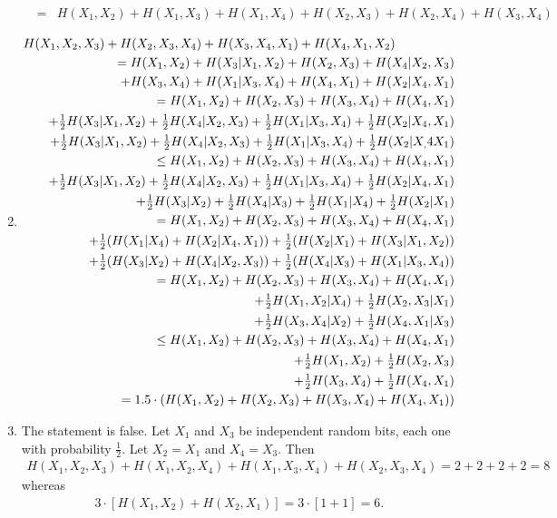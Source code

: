 \documentclass[11pt]{article} \usepackage{amssymb}
\newcommand{\half}{{\textstyle \frac12}}
\begin{document}
\begin{enumerate}
\begin{eqnarray*}
&=&H(X_1,X_2)+H(X_1,X_3)+H(X_1,X_4)+H(X_2,X_3)+H(X_2,X_4)+H(X_3,X_4) 
  \end{eqnarray*}
\item
  \begin{eqnarray*}
    \lefteqn{H(X_1,X_2,X_3)+H(X_2,X_3,X_4)+H(X_3,X_4,X_1)+H(X_4,X_1,X_2)}\\
&&= H(X_1,X_2)+H(X_3|X_1,X_2)+H(X_2,X_3)+H(X_4|X_2,X_3)\\
&&\quad+H(X_3,X_4)+H(X_1|X_3,X_4)+H(X_4,X_1)+H(X_2|X_4,X_1)\\
&&= H(X_1,X_2)+H(X_2,X_3)+H(X_3,X_4)+H(X_4,X_1)\\
&&\quad+\half H(X_3|X_1,X_2)+\half H(X_4|X_2,X_3)+\half H(X_1|X_3,X_4)+\half H(X_2|X_4,X_1)\\
&&\quad+\half H(X_3|X_1,X_2)+\half H(X_4|X_2,X_3)+\half H(X_1|X_3,X_4)+\half H(X_2|X_,4X_1)\\
&&\leq H(X_1,X_2)+H(X_2,X_3)+H(X_3,X_4)+H(X_4,X_1)\\
&&\quad+\half H(X_3|X_1,X_2)+\half H(X_4|X_2,X_3)+\half H(X_1|X_3,X_4)+\half H(X_2|X_4,X_1)\\
&&\quad+\half H(X_3|X_2)+\half H(X_4|X_3)+\half H(X_1|X_4)+\half H(X_2|X_1)\\
&&= H(X_1,X_2)+H(X_2,X_3)+H(X_3,X_4)+H(X_4,X_1)\\
&&\quad+\half (H(X_1|X_4)+H(X_2|X_4,X_1))+\half (H(X_2|X_1)+H(X_3|X_1,X_2))\\
&&\quad+\half (H(X_3|X_2)+H(X_4|X_2,X_3))+\half (H(X_4|X_3)+H(X_1|X_3,X_4))\\
&&= H(X_1,X_2)+H(X_2,X_3)+H(X_3,X_4)+H(X_4,X_1)\\
&&\quad+\half H(X_1,X_2|X_4)+\half H(X_2,X_3|X_1)\\
&&\quad+\half H(X_3,X_4|X_2)+\half H(X_4,X_1|X_3)\\
&&\leq H(X_1,X_2)+H(X_2,X_3)+H(X_3,X_4)+H(X_4,X_1)\\
&&\quad+\half H(X_1,X_2)+\half H(X_2,X_3)\\
&&\quad+\half H(X_3,X_4)+\half H(X_4,X_1)\\
&&= 1.5\cdot\left(H(X_1,X_2)+H(X_2,X_3)+H(X_3,X_4)+H(X_4,X_1)\right)
\end{eqnarray*}
\item
The statement is false. Let $X_1$ and $X_3$ be independent random bits,
each one with probability $\half$. Let $X_2=X_1$ and $X_4=X_3$. Then
\begin{eqnarray*}
  H(X_1,X_2,X_3)+H(X_1,X_2,X_4)+H(X_1,X_3,X_4)+H(X_2,X_3,X_4) = 2 + 2 + 2 + 2=8
\end{eqnarray*}
whereas
\begin{eqnarray*}
  3\cdot[H(X_1,X_2)+H(X_2,X_1)]=3\cdot[1+1] = 6.
\end{eqnarray*}
\end{enumerate}
\end{document}
